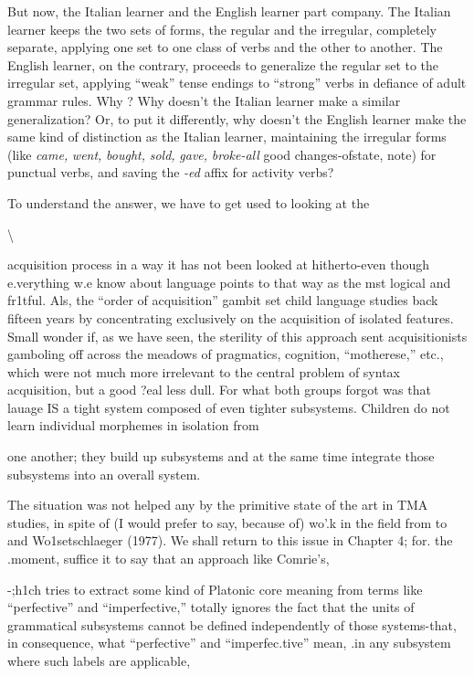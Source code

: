But now, the Italian learner and the English learner part com\-pany. The Italian learner keeps the two sets of forms, the regular and the irregular, completely separate, applying one set to one class of verbs and the other to another. The English learner, on the contrary, proceeds to generalize the regular set to the irregular set, applying ``weak'' tense endings to ``strong'' verbs in defiance of adult grammar rules. Why ? Why doesn't the Italian learner make a similar generaliza\-tion? Or, to put it differently, why doesn't the English learner make the same kind of distinction as the Italian learner, maintaining the irregular forms (like \textit{came,} \textit{went,} \textit{bought,} \textit{sold,} \textit{gave,} \textit{broke-all} good changes-ofstate, note) for punctual verbs, and saving the \textit{{}-ed} affix for activity verbs?

To understand the answer, we have to get used to looking at the

{\textbackslash}


acquisition process in a way it has not been looked at hitherto-even though e.verything w.e know about language points to that way as the mst logical and fr1tful. Als, the ``order of acquisition'' gambit set child language studies back fifteen years by concentrating exclusively on the acquisition of isolated features. Small wonder if, as we have seen, the sterility of this approach sent acquisitionists gamboling off across the meadows of pragmatics, cognition, ``motherese,'' etc., which were not much more irrelevant to the central problem of syntax acquisition, but a good ?eal less dull. For what both groups forgot was that lauage IS a tight system composed of even tighter sub\-systems. Children do not learn individual morphemes in isolation from

one another; they build up subsystems and at the same time integrate those subsystems into an overall system.

The situation was not helped any by the primitive state of the art in TMA studies, in spite of (I would prefer to say, because of) wo'.k in the field from \citet{Reichenbach1947} to \citet{Comrie1976} and Wo1setschlaeger (1977). We shall return to this issue in Chapter 4; for. the .moment, suffice it to say that an approach like Comrie's,

{}-;h1ch tries to extract some kind of Platonic core meaning from terms like ``perfective'' and ``imperfective,'' totally ignores the fact that the units of grammatical subsystems cannot be defined independently of those systems-that, in consequence, what ``perfective'' and ``im\-perfec.tive'' mean, .in any subsystem where such labels are applicable,

